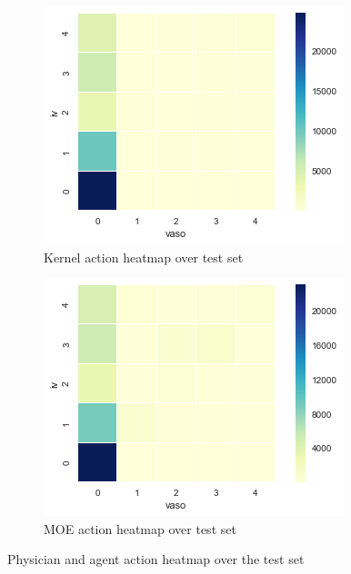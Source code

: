 \documentclass[letterpaper]{article}
\begin{document}
\begin{figure}[H]
\begin{subfigure}{0.48\linewidth}
  \includegraphics[width=0.9\linewidth]{figures/Kernel_test_heatmap.png}\hfill
  \caption{Kernel action heatmap over test set}
  \label{fig:Kernel_test_heatmap}
  \end{subfigure}
  \begin{subfigure}{0.48\linewidth}
  \centering
  \includegraphics[width=0.9\linewidth]{figures/MOE_test_heatmap.png}\hfill
  \caption{MOE action heatmap over test set}
  \label{fig:MOE_test_heatmap}
  \end{subfigure}
  \caption{Physician and agent action heatmap over the test set}
  \label{fig:test_action_heat}
\end{figure}
\end{document}
